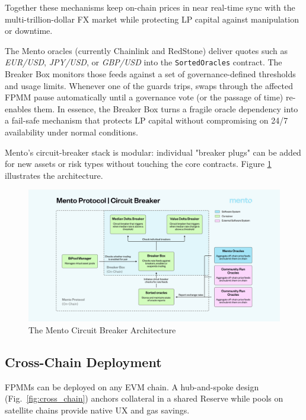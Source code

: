 \documentclass[a4paper]{article}
\providecommand{\hyp}{-}
\theoremstyle{definition}
\begin{document}
Together these mechanisms keep on-chain prices in near real-time sync with the multi-trillion-dollar FX market while protecting LP capital against manipulation or downtime.

The Mento oracles (currently Chainlink and RedStone) deliver quotes such as
\emph{EUR/USD}, \emph{JPY/USD}, or \emph{GBP/USD} into the
\verb|SortedOracles| contract.  The Breaker Box monitors those feeds against a
set of governance-defined thresholds and usage limits.  Whenever one of the
guards trips, swaps through the affected FPMM pause automatically until a
governance vote (or the passage of time) re-enables them.  In essence, the
Breaker Box turns a fragile oracle dependency into a fail-safe mechanism that
protects LP capital without compromising on 24/7 availability under normal
conditions.

Mento's circuit-breaker stack is modular: individual "breaker plugs" can be
added for new assets or risk types without touching the core contracts.  Figure
\ref{fig:circuit_breaker} illustrates the architecture.

\begin{figure}[ht]
    \centering
    \includegraphics[width=1.0\linewidth]{figures/mento_circuit_breaker.png}
    \caption{The Mento Circuit Breaker Architecture}
    \label{fig:circuit_breaker}
\end{figure}

\subsection{Cross\hyp Chain Deployment}
FPMMs can be deployed on any EVM chain.  A hub\hyp and\hyp spoke design (Fig.~\ref{fig:cross_chain})
anchors collateral in a shared Reserve while pools on satellite chains provide native UX and
gas savings.
\end{document}
